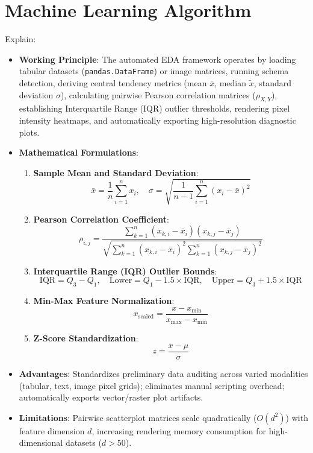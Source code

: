 \documentclass[12pt,a4paper]{article}
\begin{document}
\section{Machine Learning Algorithm}
Explain:
\begin{itemize}
\item \textbf{Working Principle}: 
The automated EDA framework operates by loading tabular datasets (\texttt{pandas.DataFrame}) or image matrices, running schema detection, deriving central tendency metrics (mean $\bar{x}$, median $\tilde{x}$, standard deviation $\sigma$), calculating pairwise Pearson correlation matrices ($\rho_{X,Y}$), establishing Interquartile Range (IQR) outlier thresholds, rendering pixel intensity heatmaps, and automatically exporting high-resolution diagnostic plots.

\item \textbf{Mathematical Formulations}:
\begin{enumerate}
\item \textbf{Sample Mean and Standard Deviation}:
$$\bar{x} = \frac{1}{n} \sum_{i=1}^n x_i, \quad \sigma = \sqrt{\frac{1}{n-1} \sum_{i=1}^n (x_i - \bar{x})^2}$$

\item \textbf{Pearson Correlation Coefficient}:
$$\rho_{i,j} = \frac{\sum_{k=1}^n (x_{k,i} - \bar{x}_i)(x_{k,j} - \bar{x}_j)}{\sqrt{\sum_{k=1}^n (x_{k,i} - \bar{x}_i)^2 \sum_{k=1}^n (x_{k,j} - \bar{x}_j)^2}}$$

\item \textbf{Interquartile Range (IQR) Outlier Bounds}:
$$\text{IQR} = Q_3 - Q_1, \quad \text{Lower} = Q_1 - 1.5 \times \text{IQR}, \quad \text{Upper} = Q_3 + 1.5 \times \text{IQR}$$

\item \textbf{Min-Max Feature Normalization}:
$$x_{\text{scaled}} = \frac{x - x_{\text{min}}}{x_{\text{max}} - x_{\text{min}}}$$

\item \textbf{Z-Score Standardization}:
$$z = \frac{x - \mu}{\sigma}$$
\end{enumerate}

\item \textbf{Advantages}:
Standardizes preliminary data auditing across varied modalities (tabular, text, image pixel grids); eliminates manual scripting overhead; automatically exports vector/raster plot artifacts.

\item \textbf{Limitations}:
Pairwise scatterplot matrices scale quadratically ($O(d^2)$) with feature dimension $d$, increasing rendering memory consumption for high-dimensional datasets ($d > 50$).
\end{itemize}
\end{document}
